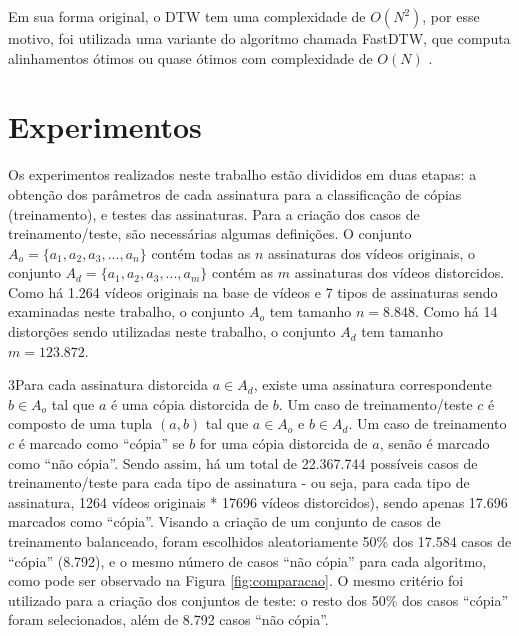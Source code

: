 
Em sua forma original, o DTW tem uma complexidade de $ O(N^{2}) $, por esse motivo, foi utilizada uma variante do algoritmo chamada FastDTW, que computa alinhamentos ótimos ou quase ótimos com complexidade de $O(N)$ \cite{salvador2007toward}.


\section{Experimentos}
\label{sec:met-Experimentos}

Os experimentos realizados neste trabalho estão divididos em duas etapas: a obtenção dos parâmetros de cada assinatura para a classificação de cópias (treinamento), e testes das assinaturas. Para a criação dos casos de treinamento/teste, são necessárias algumas definições. O conjunto $A_o = \{a_1, a_2, a_3, ..., a_n\}$ contém todas as $n$ assinaturas dos vídeos originais, o conjunto $A_d = \{a_1, a_2, a_3, ..., a_m\}$ contém as $m$ assinaturas dos vídeos distorcidos. Como há 1.264 vídeos originais na base de vídeos e 7 tipos de assinaturas sendo examinadas neste trabalho, o conjunto $A_o$ tem tamanho $n=8.848$. Como há 14 distorções sendo utilizadas neste trabalho, o conjunto $A_d$ tem tamanho $m=123.872$.

3Para cada assinatura distorcida $a \in A_d$, existe uma assinatura correspondente $b \in A_o$ tal que $a$ é uma cópia distorcida de $b$. Um caso de treinamento/teste $c$ é composto de uma tupla $(a, b)$ tal que $a \in A_o$ e $b \in A_d$. Um caso de treinamento $c$ é marcado como ``cópia'' se $b$ for uma cópia distorcida de $a$, senão é marcado como ``não cópia''. Sendo assim, há um total de 22.367.744 possíveis casos de treinamento/teste para cada tipo de assinatura - ou seja, para cada tipo de assinatura, 1264 vídeos originais * 17696 vídeos distorcidos), sendo apenas 17.696 marcados como ``cópia''. Visando a criação de um conjunto de casos de treinamento balanceado, foram escolhidos aleatoriamente 50\% dos 17.584 casos de ``cópia'' (8.792), e o mesmo número de casos ``não cópia'' para cada algoritmo, como pode ser observado na Figura \ref{fig:comparacao}. O mesmo critério foi utilizado para a criação dos conjuntos de teste: o resto dos 50\% dos casos ``cópia'' foram selecionados, além de 8.792 casos ``não cópia''.

